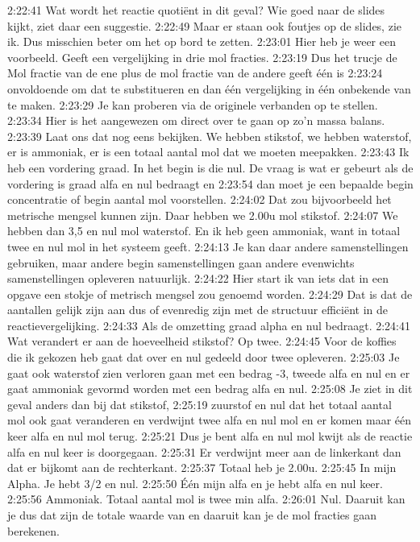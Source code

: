 2:22:41
Wat wordt het reactie quotiënt in dit geval? Wie goed naar de slides kijkt, ziet daar een suggestie.
2:22:49
Maar er staan ook foutjes op de slides, zie ik. Dus misschien beter om het op bord te zetten.
2:23:01
Hier heb je weer een voorbeeld. Geeft een vergelijking in drie mol fracties.
2:23:19
Dus het trucje de Mol fractie van de ene plus de mol fractie van de andere geeft één is
2:23:24
onvoldoende om dat te substitueren en dan één vergelijking in één onbekende van te maken.
2:23:29
Je kan proberen via de originele verbanden op te stellen.
2:23:34
Hier is het aangewezen om direct over te gaan op zo'n massa balans.
2:23:39
Laat ons dat nog eens bekijken. We hebben stikstof, we hebben waterstof, er is ammoniak, er is een totaal aantal mol dat we moeten meepakken.
2:23:43
Ik heb een vordering graad. In het begin is die nul. De vraag is wat er gebeurt als de vordering is graad alfa en nul bedraagt en
2:23:54
dan moet je een bepaalde begin concentratie of begin aantal mol voorstellen.
2:24:02
Dat zou bijvoorbeeld het metrische mengsel kunnen zijn. Daar hebben we 2.00u mol stikstof.
2:24:07
We hebben dan 3,5 en nul mol waterstof. En ik heb geen ammoniak, want in totaal twee en nul mol in het systeem geeft.
2:24:13
Je kan daar andere samenstellingen gebruiken, maar andere begin samenstellingen gaan andere evenwichts samenstellingen opleveren natuurlijk.
2:24:22
Hier start ik van iets dat in een opgave een stokje of metrisch mengsel zou genoemd worden.
2:24:29
Dat is dat de aantallen gelijk zijn aan dus of evenredig zijn met de structuur efficiënt in de reactievergelijking.
2:24:33
Als de omzetting graad alpha en nul bedraagt.
2:24:41
Wat verandert er aan de hoeveelheid stikstof? Op twee.
2:24:45
Voor de koffies die ik gekozen heb gaat dat over en nul gedeeld door twee opleveren.
2:25:03
Je gaat ook waterstof zien verloren gaan met een bedrag -3, tweede alfa en nul en er gaat ammoniak gevormd worden met een bedrag alfa en nul.
2:25:08
Je ziet in dit geval anders dan bij dat stikstof,
2:25:19
zuurstof en nul dat het totaal aantal mol ook gaat veranderen en verdwijnt twee alfa en nul mol en er komen maar één keer alfa en nul mol terug.
2:25:21
Dus je bent alfa en nul mol kwijt als de reactie alfa en nul keer is doorgegaan.
2:25:31
Er verdwijnt meer aan de linkerkant dan dat er bijkomt aan de rechterkant.
2:25:37
Totaal heb je 2.00u.
2:25:45
In mijn Alpha. Je hebt 3/2 en nul.
2:25:50
Één mijn alfa en je hebt alfa en nul keer.
2:25:56
Ammoniak. Totaal aantal mol is twee min alfa.
2:26:01
Nul. Daaruit kan je dus dat zijn de totale waarde van en daaruit kan je de mol fracties gaan berekenen.
